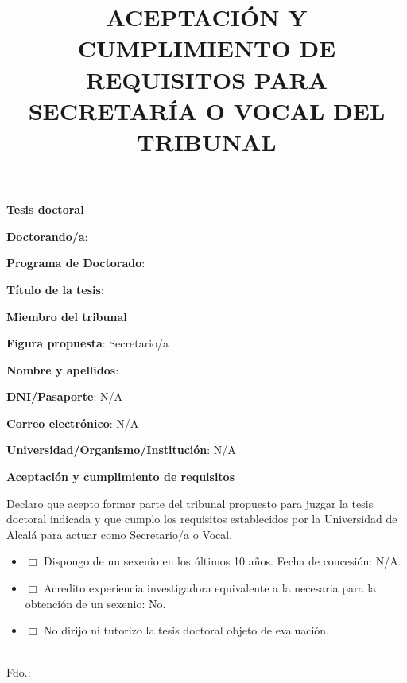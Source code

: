 \documentclass[11pt,a4paper,oneside]{article}
\title{ACEPTACIÓN Y CUMPLIMIENTO DE REQUISITOS PARA SECRETARÍA O VOCAL DEL TRIBUNAL}
\date{}
\newcommand{\PhDFormSection}[1]{%
  \vspace{0.45cm}\noindent\textbf{\large #1}\par\smallskip}
\newcommand{\PhDFormField}[2]{%
  \noindent\textbf{#1}: #2\par}
\newcommand{\PhDNA}{N/A}
\providecommand{\myTribunalAcceptanceRole}{Secretario/a} %
\providecommand{\myTribunalAcceptanceMemberFullName}{\myTribunalSecretary}
\providecommand{\myTribunalAcceptanceMemberDNI}{\PhDNA}
\providecommand{\myTribunalAcceptanceMemberEmail}{\PhDNA}
\providecommand{\myTribunalAcceptanceMemberInstitution}{\PhDNA}
\providecommand{\myTribunalAcceptanceSexenioDates}{\PhDNA}
\providecommand{\myTribunalAcceptanceEquivalentExperience}{No}
\begin{document}
\maketitle
\thispagestyle{empty}

\PhDFormSection{Tesis doctoral}
\PhDFormField{Doctorando/a}{\myAuthorFullName}
\PhDFormField{Programa de Doctorado}{\myPhDProgram}
\PhDFormField{Título de la tesis}{\myBookTitle}

\PhDFormSection{Miembro del tribunal}
\PhDFormField{Figura propuesta}{\myTribunalAcceptanceRole}
\PhDFormField{Nombre y apellidos}{\myTribunalAcceptanceMemberFullName}
\PhDFormField{DNI/Pasaporte}{\myTribunalAcceptanceMemberDNI}
\PhDFormField{Correo electrónico}{\myTribunalAcceptanceMemberEmail}
\PhDFormField{Universidad/Organismo/Institución}{\myTribunalAcceptanceMemberInstitution}

\PhDFormSection{Aceptación y cumplimiento de requisitos}
Declaro que acepto formar parte del tribunal propuesto para juzgar la tesis doctoral indicada y que cumplo los requisitos establecidos por la Universidad de Alcalá para actuar como Secretario/a o Vocal.

\begin{itemize}[leftmargin=0.8cm]
\item $\Box$ Dispongo de un sexenio en los últimos 10 años. Fecha de concesión: \myTribunalAcceptanceSexenioDates.
\item $\Box$ Acredito experiencia investigadora equivalente a la necesaria para la obtención de un sexenio: \myTribunalAcceptanceEquivalentExperience.
\item $\Box$ No dirijo ni tutorizo la tesis doctoral objeto de evaluación.
\end{itemize}

\vfill
\begin{flushright}
\myPaperworkDate\\[1.5cm]
Fdo.: \myTribunalAcceptanceMemberFullName
\end{flushright}
\end{document}

